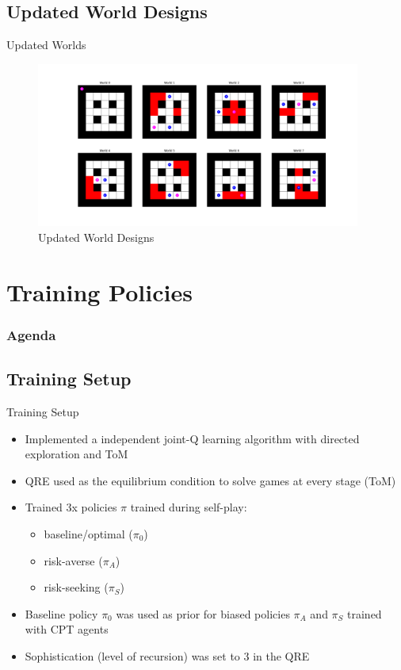\documentclass[aspectratio=1610, xcolor=dvipsnames]{packages/beamer}
\newcommand{\displayTOC}{\begin{frame}\frametitle{Agenda} \tableofcontents[currentsection, subsectionstyle=show/show/hide]\end{frame}}
\begin{document}
\subsection{Updated World Designs}
\begin{frame}{Updated Worlds}
    \begin{figure}
        \centering
        \includegraphics[width=0.95\textwidth]{../results/Fig_Worlds}
        \caption{Updated World Designs}
        \label{fig:Worlds}
    \end{figure}

\end{frame}
\section{Training Policies} \displayTOC



\subsection{Training Setup} \begin{frame}{Training Setup}
    \begin{itemize}
        \item Implemented a independent joint-Q learning algorithm with directed exploration and \ac{ToM}
        \item \Ac{QRE} used as the equilibrium condition to solve games at every stage (\ac{ToM})
        \item Trained 3x policies $\pi$ trained during self-play:
        \begin{itemize}
            \item baseline/optimal ($\pi_{0}$)
            \item risk-averse ($\pi_{A}$)
            \item risk-seeking ($\pi_{S}$)
        \end{itemize}
        \item Baseline policy $\pi_{0}$ was used as prior for biased policies $\pi_{A}$ and $\pi_{S}$ trained with \ac{CPT} agents
        \item Sophistication (level of recursion) was set to 3 in the \ac{QRE}
    \end{itemize}
\end{frame}
\end{document}
